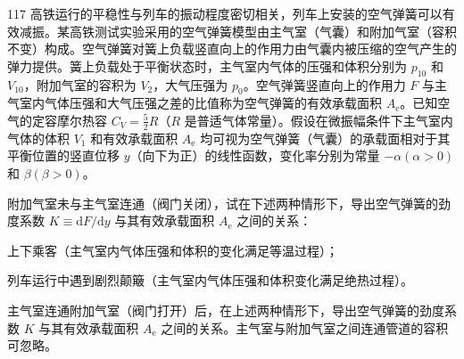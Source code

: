 \begin{problem}[2020第37届全国中学生物理竞赛复赛][高铁空气弹簧减振系统]{117}
    高铁运行的平稳性与列车的振动程度密切相关，列车上安装的空气弹簧可以有效减振。某高铁测试实验采用的空气弹簧模型由主气室（气囊）和附加气室（容积不变）构成。空气弹簧对簧上负载竖直向上的作用力由气囊内被压缩的空气产生的弹力提供。簧上负载处于平衡状态时，主气室内气体的压强和体积分别为 $p_{10}$ 和 $V_{10}$，附加气室的容积为 $V_{2}$，大气压强为 $p_{0}$。空气弹簧竖直向上的作用力 $F$ 与主气室内气体压强和大气压强之差的比值称为空气弹簧的有效承载面积 $A_{\mathrm{e}}$。已知空气的定容摩尔热容 $C_{V} = \frac{5}{2} R$（$R$ 是普适气体常量）。假设在微振幅条件下主气室内气体的体积 $V_{1}$ 和有效承载面积 $A_{\mathrm{e}}$ 均可视为空气弹簧（气囊）的承载面相对于其平衡位置的竖直位移 $y$（向下为正）的线性函数，变化率分别为常量 $-\alpha (\alpha > 0)$ 和 $\beta (\beta > 0)$。
    \begin{subproblem}
        附加气室未与主气室连通（阀门关闭），试在下述两种情形下，导出空气弹簧的劲度系数 $K \equiv \mathrm{d} F / \mathrm{d} y$ 与其有效承载面积 $A_{\mathrm{e}}$ 之间的关系：
        \begin{subsubproblem}
            上下乘客（主气室内气体压强和体积的变化满足等温过程）；
        \end{subsubproblem}
        \begin{subsubproblem}
            列车运行中遇到剧烈颠簸（主气室内气体压强和体积变化满足绝热过程）。
        \end{subsubproblem}
    \end{subproblem}
    \begin{subproblem}
        主气室连通附加气室（阀门打开）后，在上述两种情形下，导出空气弹簧的劲度系数 $K$ 与其有效承载面积 $A_{\mathrm{e}}$ 之间的关系。主气室与附加气室之间连通管道的容积可忽略。
    \end{subproblem}
\end{problem}